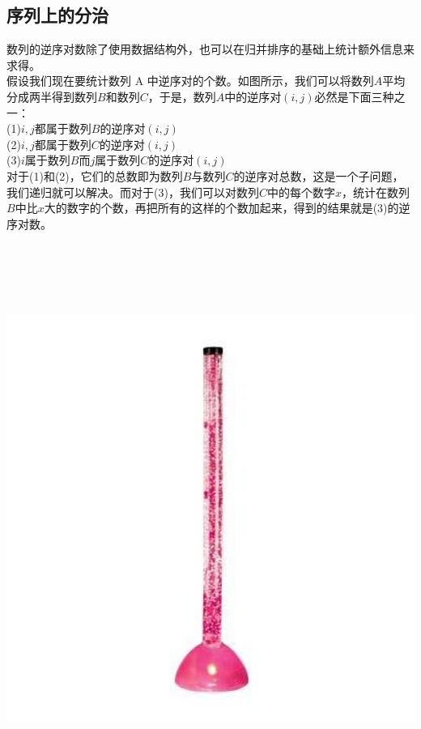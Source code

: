\documentclass[]{cpp}
\begin{document}
\subsection{序列上的分治}
	数列的逆序对数除了使用数据结构外，也可以在归并排序的基础上统计额外信息来求得。\\
	假设我们现在要统计数列 A 中逆序对的个数。如图所示，我们可以将数列$A$平均分成两半得到数列$B$和数列$C$，于是，数列$A$中的逆序对$(i,j)$必然是下面三种之一：\\
	(1)$i,j$都属于数列$B$的逆序对$(i,j)$\\
	(2)$i,j$都属于数列$C$的逆序对$(i,j)$\\
	(3)$i$属于数列$B$而$j$属于数列$C$的逆序对$(i,j)$\\
	对于(1)和(2)，它们的总数即为数列$B$与数列$C$的逆序对总数，这是一个子问题，我们递归就可以解决。而对于(3)，我们可以对数列$C$中的每个数字$x$，统计在数列$B$中比$x$大的数字的个数，再把所有的这样的个数加起来，得到的结果就是(3)的逆序对数。
\begin{center}\includegraphics[height=18cm]{assets/day4/poj2299.jpg}\end{center}
\end{document}
